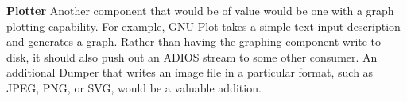 \documentclass[conference]{IEEEtran}
\begin{document}
\textbf{Plotter}
Another component that would be of value would be one with a graph plotting
capability.  For example, GNU Plot
takes a simple
text input description and generates a graph.  Rather than having the graphing
component write to disk, it should also push out an ADIOS stream to some other
consumer. An additional Dumper that writes an image file in a particular
format, such as JPEG, PNG, or SVG, would be a valuable addition.

%




\end{document}
